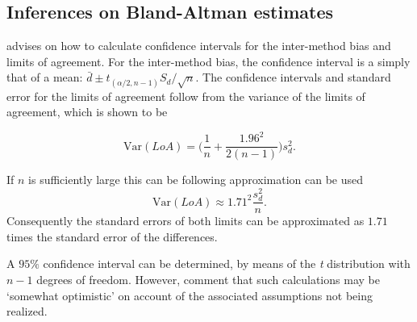\documentclass[Main.tex]{subfiles}
\begin{document}
\subsection{Inferences on Bland-Altman estimates}
\citet*{BA99} advises on how to calculate confidence intervals for the inter-method bias and limits of agreement.
For the inter-method bias, the confidence interval is a simply that of a mean: $\bar{d} \pm t_{(\alpha/2,n-1)} S_{d}/\sqrt{n}$.
The confidence
intervals and standard error for the limits of agreement follow from the variance of the limits of agreement, which is shown to be

\[
\mbox{Var}(LoA) = \bigg(\frac{1}{n}+\frac{1.96^{2}}{2(n-1)}\bigg)s_{d}^{2}.
\]

If $n$ is sufficiently large this can be following approximation
can be used
\[
\mbox{Var}(LoA) \approx 1.71^{2}\frac{s_{d}^{2}}{n}.
\]
Consequently the standard errors of both limits can be
approximated as $1.71$ times the standard error of the
differences.

A $95\%$ confidence interval can be determined, by means of the
\emph{t} distribution with $n-1$ degrees of freedom. However, \citet*{BA99} comment that such calculations  may be `somewhat optimistic' on account of the associated assumptions not being realized.

\end{document}
